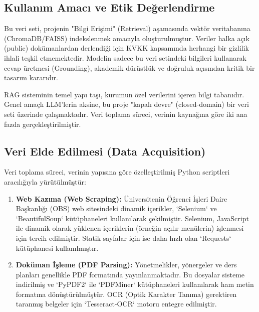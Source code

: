 \documentclass[12pt,a4paper]{report}
\begin{document}
\subsection{Kullanım Amacı ve Etik Değerlendirme}
Bu veri seti, projenin "Bilgi Erişimi" (Retrieval) aşamasında vektör veritabanına (ChromaDB/FAISS) indekslenmek amacıyla oluşturulmuştur. Veriler halka açık (public) dokümanlardan derlendiği için KVKK kapsamında herhangi bir gizlilik ihlali teşkil etmemektedir. Modelin sadece bu veri setindeki bilgileri kullanarak cevap üretmesi (Grounding), akademik dürüstlük ve doğruluk açısından kritik bir tasarım kararıdır.

RAG sisteminin temel yapı taşı, kurumun özel verilerini içeren bilgi tabanıdır. Genel amaçlı LLM'lerin aksine, bu proje "kapalı devre" (closed-domain) bir veri seti üzerinde çalışmaktadır. Veri toplama süreci, verinin kaynağına göre iki ana fazda gerçekleştirilmiştir.

\subsection{Veri Elde Edilmesi (Data Acquisition)}
Veri toplama süreci, verinin yapısına göre özelleştirilmiş Python scriptleri aracılığıyla yürütülmüştür:
\begin{enumerate}
    \item \textbf{Web Kazıma (Web Scraping):} Üniversitenin Öğrenci İşleri Daire Başkanlığı (OBS) web sitesindeki dinamik içerikler, `Selenium` ve `BeautifulSoup` kütüphaneleri kullanılarak çekilmiştir. Selenium, JavaScript ile dinamik olarak yüklenen içeriklerin (örneğin açılır menülerin) işlenmesi için tercih edilmiştir. Statik sayfalar için ise daha hızlı olan `Requests` kütüphanesi kullanılmıştır.
    \item \textbf{Doküman İşleme (PDF Parsing):} Yönetmelikler, yönergeler ve ders planları genellikle PDF formatında yayınlanmaktadır. Bu dosyalar sisteme indirilmiş ve `PyPDF2` ile `PDFMiner` kütüphaneleri kullanılarak ham metin formatına dönüştürülmüştür. OCR (Optik Karakter Tanıma) gerektiren taranmış belgeler için `Tesseract-OCR` motoru entegre edilmiştir.
\end{enumerate}
\end{document}
